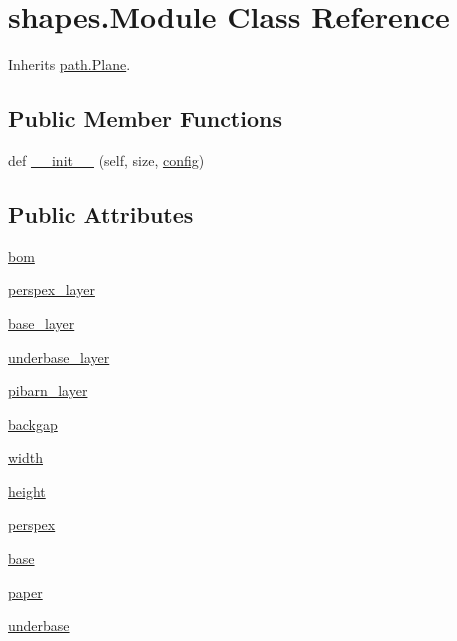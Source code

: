 \hypertarget{classshapes_1_1_module}{}\section{shapes.\+Module Class Reference}
\label{classshapes_1_1_module}


Inherits \hyperlink{classpath_1_1_plane}{path.\+Plane}.

\subsection*{Public Member Functions}
\begin{DoxyCompactItemize}
\item 
def \hyperlink{classshapes_1_1_module_a04e446e8ef138c8ea18f38df7fc99935}{\+\_\+\+\_\+init\+\_\+\+\_\+} (self, size, \hyperlink{classpath_1_1_plane_a9c3565a0c72c585ffd3d9305d9e59b64}{config})
\end{DoxyCompactItemize}
\subsection*{Public Attributes}
\begin{DoxyCompactItemize}
\item 
\hyperlink{classshapes_1_1_module_a03f8526270348aa01870341f71585e72}{bom}
\item 
\hyperlink{classshapes_1_1_module_a402a64427f8ffe5f46611459ea497776}{perspex\+\_\+layer}
\item 
\hyperlink{classshapes_1_1_module_ac9aaa9c2e58d198b0f4749d2183297ca}{base\+\_\+layer}
\item 
\hyperlink{classshapes_1_1_module_a83b5d6a540e5ee42db561e0bc8569562}{underbase\+\_\+layer}
\item 
\hyperlink{classshapes_1_1_module_aa5f8f21ac48d755e251e1bf33c42c1ec}{pibarn\+\_\+layer}
\item 
\hyperlink{classshapes_1_1_module_ab209624dffecfc33a7410dda997c27f7}{backgap}
\item 
\hyperlink{classshapes_1_1_module_a3ed342ba3d585a3efb51ebbf4679720f}{width}
\item 
\hyperlink{classshapes_1_1_module_adf009e86e07064ae6997cb7a8bf8aef8}{height}
\item 
\hyperlink{classshapes_1_1_module_a927cbd0791f0c2df66627a81f5c27faa}{perspex}
\item 
\hyperlink{classshapes_1_1_module_a28d52660b6f10ba2e97c47089d3d1afd}{base}
\item 
\hyperlink{classshapes_1_1_module_ae0fbc8d70e8dccf42ad620aec94e2692}{paper}
\item 
\hyperlink{classshapes_1_1_module_ac05cf9348ab70df94cbe4f1eadb191e1}{underbase}
\end{DoxyCompactItemize}


